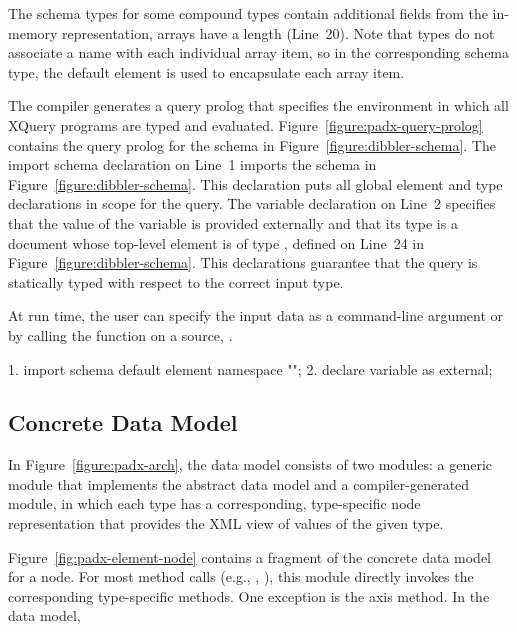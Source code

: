 The schema types for some compound types contain additional fields
from the \pads{} in-memory representation, \eg{} arrays have a length
(Line~20).  Note that  types do not associate a name with
each individual array item, so in the corresponding schema type, the
default element  is used to encapsulate each array item.

The \pads{} compiler generates a query prolog that specifies the
environment in which all XQuery programs are typed and evaluated.
Figure~\ref{figure:padx-query-prolog} contains the query prolog for
the schema in Figure~\ref{figure:dibbler-schema}.  The import schema
declaration on Line~1 imports the schema in
Figure~\ref{figure:dibbler-schema}.  This declaration puts all global
element and type declarations in scope for the query.  The variable
declaration on Line~2 specifies that the value of the variable
 is provided externally and that its type is a document
whose top-level element is of type , defined on Line~24 in
Figure~\ref{figure:dibbler-schema}.  This declarations guarantee
that the query is statically typed with respect to the correct input type.

At run time, the user can specify
the input data as a command-line argument or by calling the
 function on a \pads{} source, \eg{} .
\begin{figure*}
\begin{small}
\begin{code}
 1. import schema default element namespace "";
 2. declare variable  as  external; 
\end{code}
\end{small}
\caption{\padx{} generated query prolog}
\label{figure:padx-query-prolog}
\end{figure*}

\subsection{\padx{} Concrete Data Model}

In Figure~\ref{figure:padx-arch}, the \pads{} data model consists of
two modules: a generic module that implements the \Galax{} abstract
data model and a compiler-generated module, in which each \pads{} type
has a corresponding, type-specific node representation that provides
the XML view of values of the given type.

Figure~\ref{fig:padx-element-node} contains a fragment of the \padx{}
concrete data model for a node.  For most method calls (e.g.,
, ), this module directly invokes 
the corresponding type-specific methods.  One exception is the
 axis method.  In the \padx{} data model, 

